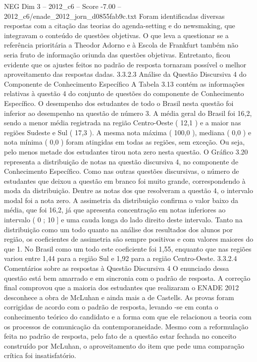 \begin{textsample}{NEG Dim 3 – 2012\_c6 – Score -7.00 – 2012\_c6/enade\_2012\_jorn\_d0855fab9c.txt}
Foram identificadas diversas respostas com a citação das teorias do agenda-setting e do newsmaking, que integravam o conteúdo de questões objetivas.
O que leva a questionar se a referência prioritária a Theodor Adorno e à Escola de Frankfurt também não seria fruto de informação oriunda das questões objetivas.
Entretanto, ficou evidente que os ajustes feitos no padrão de resposta tornaram possível o melhor aproveitamento das respostas dadas. 3.3.2.3 Análise da Questão Discursiva 4 do Componente de Conhecimento Específico A Tabela 3.13 contém as informações relativas à questão 4 do conjunto de questões do componente de Conhecimento Específico.
O desempenho dos estudantes de todo o Brasil nesta questão foi inferior ao desempenho na questão de número 3.
A média geral do Brasil foi 16,2, sendo a menor média registrada na região Centro-Oeste ( 12,1 ) e a maior nas regiões Sudeste e Sul ( 17,3 ).
A mesma nota máxima ( 100,0 ), mediana ( 0,0 ) e nota mínima ( 0,0 ) foram atingidas em todas as regiões, sem exceção.
Ou seja, pelo menos metade dos estudantes tirou nota zero nesta questão.
O Gráfico 3.20 representa a distribuição de notas na questão discursiva 4, no componente de Conhecimento Específico.
Como nas outras questões discursivas, o número de estudantes que deixou a questão em branco foi muito grande, correspondendo à moda da distribuição.
Dentre as notas dos que resolveram a questão 4, o intervalo modal foi a nota zero.
A assimetria da distribuição confirma o valor baixo da média, que foi 16,2, já que apresenta concentração em notas inferiores ao intervalo ( 0 ; 10 ] e uma cauda longa do lado direito deste intervalo.
Tanto na distribuição como um todo quanto na análise dos resultados dos alunos por região, os coeficientes de assimetria são sempre positivos e com valores maiores do que 1.
No Brasil como um todo este coeficiente foi 1,55, enquanto que nas regiões variou entre 1,44 para a região Sul e 1,92 para a região Centro-Oeste. 3.3.2.4 Comentários sobre as respostas à Questão Discursiva 4 O enunciado dessa questão está bem amarrado e em sincronia com o padrão de resposta.
A correção final comprovou que a maioria dos estudantes que realizaram o ENADE 2012 desconhece a obra de McLuhan e ainda mais a de Castells.
As provas foram corrigidas de acordo com o padrão de resposta, levando -se em conta o conhecimento teórico do candidato e a forma com que ele relacionou a teoria com os processos de comunicação da contemporaneidade.
Mesmo com a reformulação feita no padrão de resposta, pelo fato de a questão estar fechada no conceito construído por McLuhan, o aproveitamento do item que pede uma comparação crítica foi insatisfatório.

\end{textsample}
